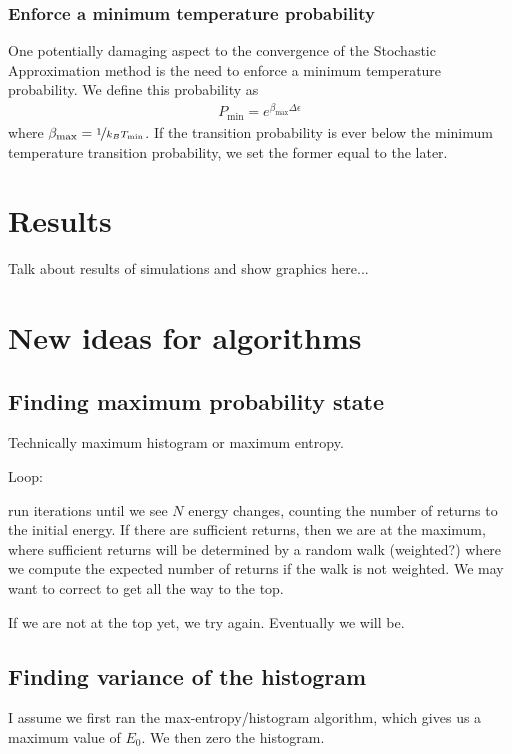 \documentclass[letterpaper,twocolumn,amsmath,amssymb,pre,aps,10pt]{revtex4-1}
\begin{document}
\subsubsection{Enforce a minimum temperature probability}
One potentially damaging aspect to the convergence of the Stochastic
Approximation method is the need to enforce a minimum temperature
probability.  We define this probability as
\begin{align}
P_{\text{min}} = e^{\beta_{\text{max}}\Delta\epsilon}
\end{align}
where $\beta_{\text{max}} = \nicefrac{1}{k_B T_\text{min}}$.  If the
transition probability is ever below the minimum temperature transition
probability, we set the former equal to the later.

\section{Results}

Talk about results of simulations and show graphics here...


\section{New ideas for algorithms}

\subsection{Finding maximum probability state}

Technically maximum histogram or maximum entropy.

Loop:

run iterations until we see $N$ energy changes, counting the number of
returns to the initial energy.  If there are sufficient returns, then
we are at the maximum, where sufficient returns will be determined by
a random walk (weighted?) where we compute the expected number of
returns if the walk is not weighted.  We may want to correct to get
all the way to the top.

If we are not at the top yet, we try again.  Eventually we will be.

\subsection{Finding variance of the histogram}

I assume we first ran the max-entropy/histogram algorithm, which gives
us a maximum value of $E_0$.  We then zero the histogram.
\end{document}
